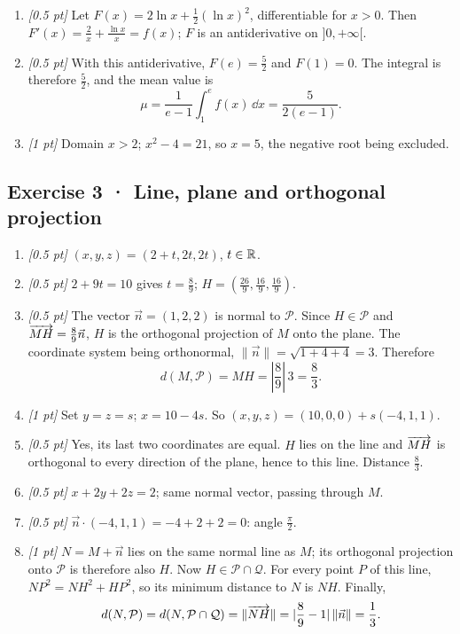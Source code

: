 \begin{enumerate}
\item \textit{[0.5 pt]} Let $F(x)=2\ln x+\frac12(\ln x)^2$, differentiable for $x>0$. Then $F'(x)=\frac{2}{x}+\frac{\ln x}{x}=f(x)$; $F$ is an antiderivative on $]0,+\infty[$.

\item \textit{[0.5 pt]} With this antiderivative, $F(e)=\frac{5}{2}$ and $F(1)=0$. The integral is therefore $\frac{5}{2}$, and the mean value is
\[\mu=\frac{1}{e-1}\int_1^e f(x)\,\dd x=\frac{5}{2(e-1)}.\]

\item \textit{[1 pt]} Domain $x>2$; $x^2-4=21$, so $x=5$, the negative root being excluded.

\end{enumerate}

\subsection*{Exercise 3 · Line, plane and orthogonal projection}\begin{enumerate}

\item \textit{[0.5 pt]} $(x,y,z)=(2+t,2t,2t)$, $t\in\mathbb R$.

\item \textit{[0.5 pt]} $2+9t=10$ gives $t=\frac{8}{9}$; $H=(\frac{26}{9},\frac{16}{9},\frac{16}{9})$.

\item \textit{[0.5 pt]} The vector $\vec n=(1,2,2)$ is normal to $\mathcal P$. Since $H\in\mathcal P$ and $\overrightarrow{MH}=\frac{8}{9}\vec n$, $H$ is the orthogonal projection of $M$ onto the plane. The coordinate system being orthonormal, $\|\vec n\|=\sqrt{1+4+4}=3$. Therefore
\[d(M,\mathcal P)=MH=|\frac{8}{9}|\,3=\frac{8}{3}.\]

\item \textit{[1 pt]} Set $y=z=s$; $x=10-4s$. So $(x,y,z)=(10,0,0)+s(-4,1,1)$.

\item \textit{[0.5 pt]} Yes, its last two coordinates are equal. $H$ lies on the line and $\overrightarrow{MH}$ is orthogonal to every direction of the plane, hence to this line. Distance $\frac{8}{3}$.

\item \textit{[0.5 pt]} $x+2y+2z=2$; same normal vector, passing through $M$.

\item \textit{[0.5 pt]} $\vec n\cdot(-4,1,1)=-4+2+2=0$: angle $\frac{\pi}{2}$.

\item \textit{[1 pt]} $N=M+\vec n$ lies on the same normal line as $M$; its orthogonal projection onto $\mathcal P$ is therefore also $H$. Now $H\in\mathcal P\cap\mathcal Q$. For every point $P$ of this line, $NP^2=NH^2+HP^2$, so its minimum distance to $N$ is $NH$. Finally,
\[d(N,\mathcal P)=d(N,\mathcal P\cap\mathcal Q)=\|\overrightarrow{NH}\|=|\frac{8}{9}-1|\,\|\vec n\|=\frac{1}{3}.\]

\end{enumerate}

